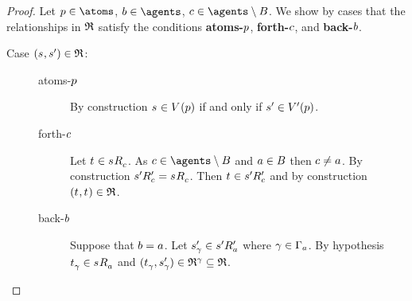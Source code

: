 \begin{proof}
Let $\atomP \in \atoms$, $\agentB \in \agents$, $\agentC \in \agents \setminus \agentsB$.
We show by cases that the relationships in $\mathfrak{R}$ satisfy the conditions {\bf atoms-$p$}, {\bf forth-$c$}, and {\bf back-$b$}.

\begin{description}
    \item[Case $(\kStateS, \kStateSP) \in \refinement$:]
        \hfill
        \begin{description}
            \item[atoms-$p$] 
                By construction $\kStateS \in \kValuation(\atomP)$ if and only if ${s}^{\prime} \in {V^{\prime}}(p)$.
            \item[forth-$c$]
                Let $\kStateT \in \kSuccessorsC{\kStateS}$.
                As $\agentC \in \agents \setminus \agentsB$ and $a \in B$ then $c \neq a$.
                By construction $\kSuccessorsPC{\kStateSP} = \kSuccessorsC{\kStateS}$.
                Then $\kStateT \in \kSuccessorsPC{\kStateSP}$ and by construction $(\kStateT, \kStateT) \in \refinement$.
            \item[back-$b$]
                Suppose that $b = a$.
                Let ${s}^{\prime}_\gamma \in {{s}^{\prime}} {R^{\prime}_{a}}$ where $\gamma \in \Gamma_a$.
                By hypothesis $\kStateT_\gamma \in \kSuccessorsA{\kStateS}$ and $(\kStateT_\gamma, \kStateSP_\gamma) \in \refinement^\gamma \subseteq \refinement$.


\end{description}
\end{description}
\end{proof}
